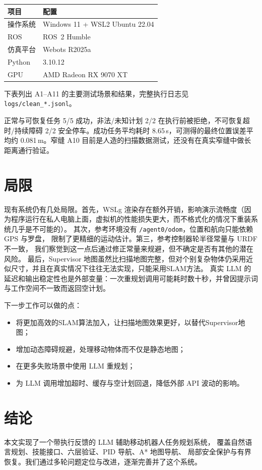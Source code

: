 \documentclass[10pt,twocolumn]{ctexart}
\begin{document}
\begin{center}
\footnotesize
\begin{tabular}{ll}
\hline
项目 & 配置 \\
\hline
操作系统 & Windows 11 + WSL2 Ubuntu 22.04 \\
ROS & ROS~2 Humble \\
仿真平台 & Webots R2025a \\
Python & 3.10.12 \\
GPU & AMD Radeon RX 9070 XT \\
\hline
\end{tabular}
\end{center}

下表列出 A1--A11 的主要测试场景和结果，完整执行日志见 \texttt{logs/clean\_*.jsonl}。


正常与可恢复任务 5/5 成功，非法/未知计划 2/2 在执行前被拒绝，不可恢复超时/持续障碍 2/2 安全停车。成功任务平均耗时 8.65\,s，可测得的最终位置误差平均约 0.081\,m。窄缝 A10 目前是人造的扫描数据测试，还没有在真实窄缝中做长距离通行验证。

\section{局限}
\label{sec:discussion}

现有系统仍有几处局限。首先，WSLg 渲染存在额外开销，影响演示流畅度（因为程序运行在私人电脑上面，虚拟机的性能损失更大，而不格式化的情况下重装系统几乎是不可能的）。
其次，参考环境没有 \texttt{/agent0/odom}，位置和航向只能依赖 GPS 与罗盘，
限制了更精细的运动估计。第三，参考控制器轮半径常量与 URDF 不一致，
我们察觉到这一点后通过修正常量来规避，但不确定是否有其他的潜在风险。
最后，Supervisor 地图虽然比扫描地图完整，但对个别复杂物体仍采用近似尺寸，并且在真实情况下往往无法实现，只能采用SLAM方法。
真实 LLM 的延迟和输出稳定性也是外部变量：一次重规划调用可能耗时数十秒，并曾因提示词与工作空间不一致而返回空计划。

下一步工作可以做的点：
\begin{itemize}
  \item 将更加高效的SLAM算法加入，让扫描地图效果更好，以替代Supervisor地图；
  \item 增加动态障碍规避，处理移动物体而不仅是静态地图；
  \item 在更多失败场景中使用 LLM 重规划；
  \item 为 LLM 调用增加超时、缓存与空计划回退，降低外部 API 波动的影响。
\end{itemize}

\section{结论}
本文实现了一个带执行反馈的 LLM 辅助移动机器人任务规划系统，
覆盖自然语言规划、技能接口、六层验证、PID 导航、A* 地图导航、
局部安全保护与有界恢复。我们通过多轮问题定位与改进，逐渐完善并了这个系统。
\end{document}
